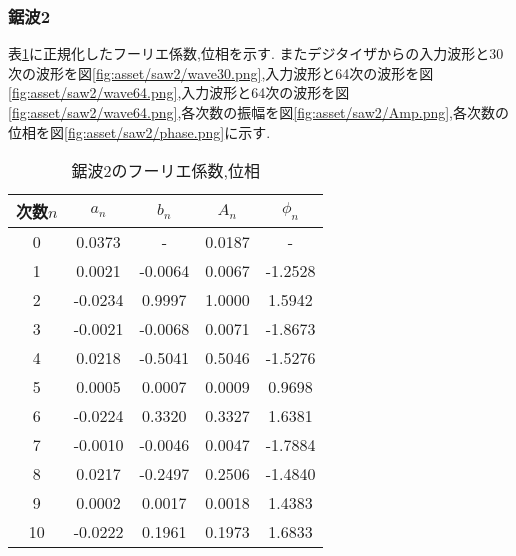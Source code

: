 \subsubsection{鋸波2}
表\ref{tab:saw2_res}に正規化したフーリエ係数,位相を示す.
またデジタイザからの入力波形と30次の波形を図\ref{fig:asset/saw2/wave30.png},入力波形と64次の波形を図\ref{fig:asset/saw2/wave64.png},入力波形と64次の波形を図\ref{fig:asset/saw2/wave64.png},各次数の振幅を図\ref{fig:asset/saw2/Amp.png},各次数の位相を図\ref{fig:asset/saw2/phase.png}に示す.
\begin{table}[h]
   \caption{鋸波2のフーリエ係数,位相}
   \label{tab:saw2_res}
   \centering
   \begin{tabular}{ccccc}
     \hline
     次数$n$&$a_n$&$b_n$&$A_n$&$\phi_n$\\
     \hline \hline
     0 & 0.0373 & - & 0.0187 & - \\
1 & 0.0021 & -0.0064 & 0.0067 & -1.2528 \\
2 & -0.0234 & 0.9997 & 1.0000 & 1.5942 \\
3 & -0.0021 & -0.0068 & 0.0071 & -1.8673 \\
4 & 0.0218 & -0.5041 & 0.5046 & -1.5276 \\
5 & 0.0005 & 0.0007 & 0.0009 & 0.9698 \\
6 & -0.0224 & 0.3320 & 0.3327 & 1.6381 \\
7 & -0.0010 & -0.0046 & 0.0047 & -1.7884 \\
8 & 0.0217 & -0.2497 & 0.2506 & -1.4840 \\
9 & 0.0002 & 0.0017 & 0.0018 & 1.4383 \\
10 & -0.0222 & 0.1961 & 0.1973 & 1.6833 \\
     \hline
   \end{tabular}
\end{table}

\begin{figure}[htbp]
  \begin{minipage}{0.5\hsize}
  \end{minipage}
  \begin{minipage}{0.5\hsize}
  \end{minipage} 
\end{figure}

\begin{figure}[htbp]
  \begin{minipage}{0.5\hsize}
  \end{minipage}
  \begin{minipage}{0.5\hsize}
  \end{minipage} 
\end{figure}

